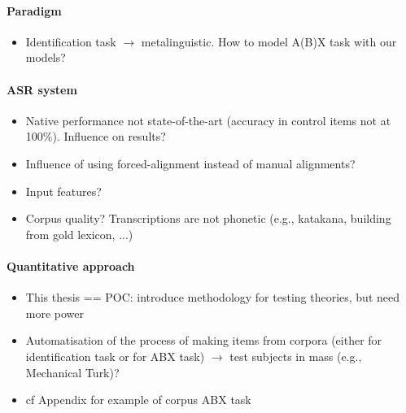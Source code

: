 \paragraph{Paradigm}
\begin{itemize}
  \item Identification task $\rightarrow$ metalinguistic. How to model A(B)X task with our models?
  \end{itemize}

\paragraph{ASR system}
\begin{itemize}
\item Native performance not state-of-the-art (accuracy in control items not at 100\%). Influence on results?
\item Influence of using forced-alignment instead of manual alignments?
\item Input features?
  \item Corpus quality? Transcriptions are not phonetic (e.g., katakana, building from gold lexicon, ...)
  \end{itemize}

 \paragraph{Quantitative approach}
 \begin{itemize}
   \item This thesis == POC: introduce methodology for testing theories, but need more power 
   \item Automatisation of the process of making items from corpora (either for identification task or for ABX task) $\rightarrow$ test subjects in mass (e.g., Mechanical Turk)? 
\item cf Appendix for example of corpus ABX task
  \end{itemize} 
